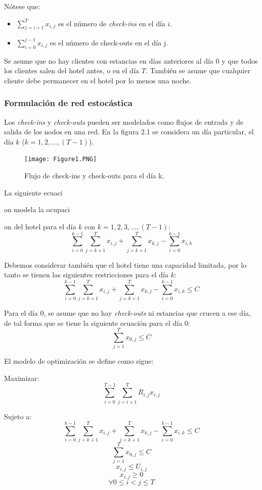 {{{Nótese que:

\begin{itemize}
  \item $\sum_{j=i+1}^{T} x_{i,j}$ es el número de \emph{check-ins} en el día $i$.
  \item $\sum_{i=0}^{j-1} x_{i,j}$ es el número de check-outs en el día j.
\end{itemize}

Se asume que no hay clientes con estancias en días anteriores al día 0 y que todos los clientes salen del hotel antes, o en el día $T$. También se asume que cualquier cliente debe permanecer en el hotel por lo menos una noche.

\subsubsection*{Formulación de red estocástica}

Los \emph{check-ins} y \emph{check-outs} pueden ser modelados como flujos de entrada y de salida de los nodos en una red. En la figura 2.1 se considera un día particular, el día $k$ ($k={1,2,...,(T-1)}$).

\begin{figure}
  \texttt{[image: Figure1.PNG]}
  \caption{Flujo de check-ins y check-outs para el día k.}
  \label{fig:Figure2.2}
\end{figure}

La siguiente ecuaci{on modela la ocupaci{on del hotel para el día $k$ con $k = 1,2,3,...,(T-1)$:$$\sum_{i=0}^{k-1}\sum_{j=k+1}^{T} x_{i,j} + \sum_{j=k+1}^{T} x_{k,j} - \sum_{i=0}^{k-1} x_{i,k}$$

Debemos considerar también que el hotel tiene una capacidad limitada, por lo tanto se tienen las siguientes restricciones para el día $k$:
$$\sum_{i=0}^{k-1}\sum_{j=k+1}^{T} x_{i,j} + \sum_{j=k+1}^{T} x_{k,j} - \sum_{i=0}^{k-1} x_{i,k} \leq C$$

Para el día 0, se asume que no hay \emph{check-outs} ni estancias que crucen a ese día, de tal forma que se tiene la siguiente ecuación para el día 0: 
$$\sum_{j=1}^{T} x_{0,j} \leq C$$

El modelo de optimización se define como sigue:

Maximizar: $$\sum_{i=0}^{T-1}\sum_{j=i+1}^{T} R_{i,j}x_{i,j}$$

Sujeto a: $$\sum_{i=0}^{k-1}\sum_{j=k+1}^{T} x_{i,j} + \sum_{j=k+1}^{T} x_{k,j} - \sum_{i=0}^{k-1} x_{i,k} \leq C$$
$$\sum_{j=1}^{T} x_{0,j} \leq C$$
$$x_{i,j} \leq U_{i,j}$$
$$x_{i,j} \geq 0$$
$$\forall 0\leq i < j \leq T$$

}}}}}
